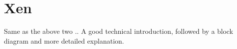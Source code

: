 %
%
%




\section{Xen}

Same as the above two .. A good technical introduction, followed by a block diagram and more detailed explanation.

%
